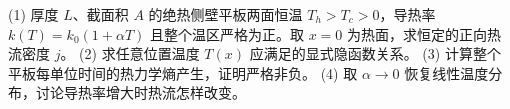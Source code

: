 (1) 厚度 \(L\)、截面积 \(A\) 的绝热侧壁平板两面恒温 \(T_h>T_c>0\)，导热率 \(k(T)=k_0(1+\alpha T)\) 且整个温区严格为正。取 \(x=0\) 为热面，求恒定的正向热流密度 \(j\)。
(2) 求任意位置温度 \(T(x)\) 应满足的显式隐函数关系。
(3) 计算整个平板每单位时间的热力学熵产生，证明严格非负。
(4) 取 \(\alpha\to0\) 恢复线性温度分布，讨论导热率增大时热流怎样改变。
